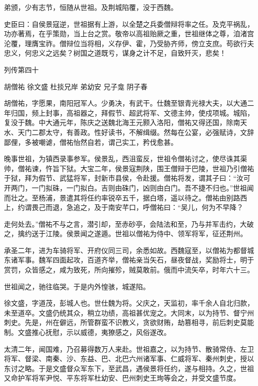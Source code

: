 \documentclass[12pt,UTF8]{ctexbook}
\begin{document}
弟颁，少有志节，恒随从世祖。及荆城陷覆，没于西魏。

史臣曰：自侯景寇逆，世祖据有上游，以全楚之兵委僧辩将率之任。及克平祸乱，功亦著焉，在乎策勋，当上台之赏。敬帝以高祖贻厥之重，世祖继体之尊，洎渚宫沦覆，理膺宝祚。僧辩位当将相，义存伊、霍，乃受胁齐师，傍立支庶。苟欲行夫忠义，何忠义之远矣？树国之道既亏，谋身之计不足，自致歼灭，悲矣！





列传第四十

胡僧祐 徐文盛 杜掞兄岸 弟幼安 兄子龛 阴子春

胡僧祐，字愿果，南阳冠军人。少勇决，有武干。仕魏至银青光禄大夫，以大通二年归国，频上封事，高祖器之，拜假节、超武将军、文德主帅，使戍项城。城陷，复没于魏。中大通元年，陈庆之送魏北海王元颢入洛阳，僧祐又得还国，除南天水、天门二郡太守，有善政。性好读书，不解缉缀。然每在公宴，必强赋诗，文辞鄙俚，多被嘲谑，僧祐怡然自若，谓己实工，矜伐愈甚。

晚事世祖，为镇西录事参军。侯景乱，西沮蛮反，世祖令僧祐讨之，使尽诛其渠帅，僧祐谏，忤旨下狱。大宝二年，侯景寇荆陕，围王僧辩于巴陵，世祖乃引僧祐于狱，拜为假节、武猛将军，封新市县侯，令赴援。僧祐将发，谓其子曰：“汝可开两门，一门拟硃，一门拟白。吉则由硃门，凶则由白门。吾不捷不归也。”世祖闻而壮之。至杨浦，景遣其将任约率锐卒五千，据白塔，遥以待之。僧祐由别路西上，约谓畏己而退，急追之，及于南安芊口，呼僧祐曰：“吴儿，何为不早降？

走何处去。”僧祐不与之言，潜引却，至赤砂亭，会陆法和至，乃与并军击约，大破之，擒约送于江陵。侯景闻之遂遁。世祖以僧祐为侍中、领军将军，征还荆州。

承圣二年，进为车骑将军、开府仪同三司，余悉如故。西魏寇至，以僧祐为都督城东诸军事。魏军四面起攻，百道齐举，僧祐亲当矢石，昼夜督战，奖励将士，明于赏罚，众皆感之，咸为致死，所向摧殄，贼莫敢前。俄而中流矢卒，时年六十三。

世祖闻之，驰往临哭。于是内外惶骇，城遂陷。

徐文盛，字道茂，彭城人也。世仕魏为将。父庆之，天监初，率千余人自北归款，未至道卒。文盛仍统其众，稍立功绩，高祖甚优宠之。大同末，以为持节、督宁州刺史。先是，州在僻远，所管群蛮不识教义，贪欲财贿，劫篡相寻，前后刺史莫能制。文盛推心抚慰，示以威德，夷獠感之，风俗遂改。

太清二年，闻国难，乃召募得数万人来赴。世祖嘉之，以为持节、散骑常侍、左卫将军、督梁、南秦、沙、东益、巴、北巴六州诸军事、仁威将军、秦州刺史，授以东讨之略。于是文盛督众军东下，至武昌，遇侯景将任约，遂与相持。久之，世祖又命护军将军尹悦、平东将军杜幼安、巴州刺史王珣等会之，并受文盛节度。
\end{document}
